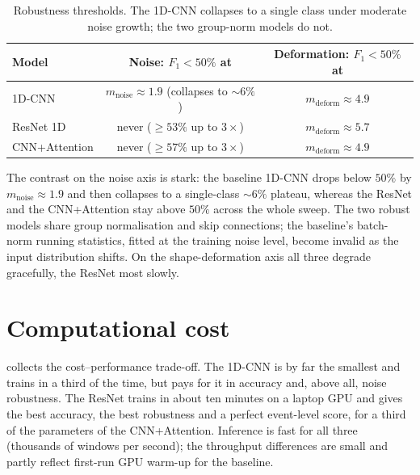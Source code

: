 \begin{table}[H]
    \centering \footnotesize
    \begin{tabular}{lcc}
        \toprule
        Model & Noise: $F_1<50\%$ at & Deformation: $F_1<50\%$ at \\
        \midrule
        1D-CNN        & $m_{\mathrm{noise}}\approx 1.9$ (collapses to $\sim 6\%$) & $m_{\mathrm{deform}}\approx 4.9$ \\
        ResNet 1D     & never ($\geq 53\%$ up to $3\times$) & $m_{\mathrm{deform}}\approx 5.7$ \\
        CNN+Attention & never ($\geq 57\%$ up to $3\times$) & $m_{\mathrm{deform}}\approx 4.9$ \\
        \bottomrule
    \end{tabular}
    \caption{Robustness thresholds. The 1D-CNN collapses to a single class under
    moderate noise growth; the two group-norm models do not.}
    \label{tab:robust}
\end{table}

The contrast on the noise axis is stark: the baseline 1D-CNN drops below $50\%$
by $m_{\mathrm{noise}}\approx 1.9$ and then collapses to a single-class
$\sim 6\%$ plateau, whereas the ResNet and the CNN+Attention stay above $50\%$
across the whole sweep. The two robust models share group normalisation and skip
connections; the baseline's batch-norm running statistics, fitted at the training
noise level, become invalid as the input distribution shifts. On the
shape-deformation axis all three degrade gracefully, the ResNet most slowly.

\section{Computational cost}
\label{sec:res-cost}

 collects the cost--performance trade-off. The 1D-CNN is by far
the smallest and trains in a third of the time, but pays for it in accuracy and,
above all, noise robustness. The ResNet trains in about ten minutes on a laptop
GPU and gives the best accuracy, the best robustness and a perfect event-level
score, for a third of the parameters of the CNN+Attention. Inference is fast for
all three (thousands of windows per second); the throughput differences are small
and partly reflect first-run GPU warm-up for the baseline.

